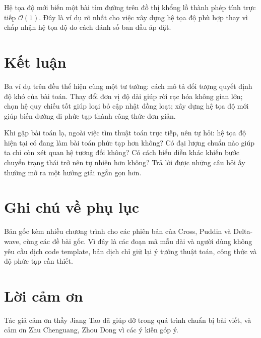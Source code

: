 \documentclass[11pt]{article}
\newcommand{\Oh}{\mathcal{O}}
\begin{document}
Hệ tọa độ mới biến một bài tìm đường trên đồ thị khổng lồ thành phép tính
trực tiếp \(\Oh(1)\). Đây là ví dụ rõ nhất cho việc xây dựng hệ tọa độ phù
hợp thay vì chấp nhận hệ tọa độ do cách đánh số ban đầu áp đặt.

\section{Kết luận}

Ba ví dụ trên đều thể hiện cùng một tư tưởng: cách mô tả đối tượng quyết định
độ khó của bài toán. Thay đổi đơn vị độ dài giúp rời rạc hóa không gian lớn;
chọn hệ quy chiếu tốt giúp loại bỏ cập nhật đồng loạt; xây dựng hệ tọa độ mới
giúp biến đường đi phức tạp thành công thức đơn giản.

Khi gặp bài toán lạ, ngoài việc tìm thuật toán trực tiếp, nên tự hỏi: hệ tọa
độ hiện tại có đang làm bài toán phức tạp hơn không? Có đại lượng chuẩn nào
giúp ta chỉ còn xét quan hệ tương đối không? Có cách biểu diễn khác khiến
bước chuyển trạng thái trở nên tự nhiên hơn không? Trả lời được những câu hỏi
ấy thường mở ra một hướng giải ngắn gọn hơn.

\section*{Ghi chú về phụ lục}

Bản gốc kèm nhiều chương trình cho các phiên bản của Cross, Puddin và
Delta-wave, cùng các đề bài gốc. Vì đây là các đoạn mã mẫu dài và người dùng
không yêu cầu dịch code template, bản dịch chỉ giữ lại ý tưởng thuật toán,
công thức và độ phức tạp cần thiết.

\section*{Lời cảm ơn}

Tác giả cảm ơn thầy Jiang Tao đã giúp đỡ trong quá trình chuẩn bị bài viết,
và cảm ơn Zhu Chenguang, Zhou Dong vì các ý kiến góp ý.
\end{document}
